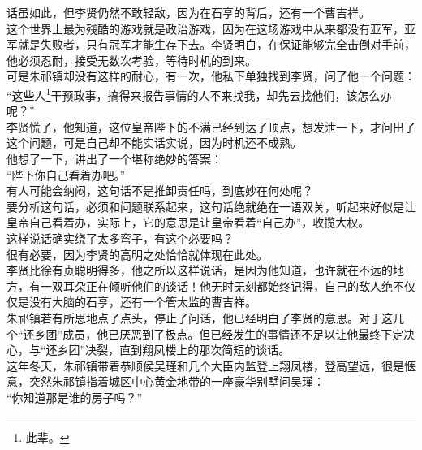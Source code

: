 \begin{multicols}{\theparacolNo}
话虽如此，但李贤仍然不敢轻敌，因为在石亨的背后，还有一个曹吉祥。\\

这个世界上最为残酷的游戏就是政治游戏，因为在这场游戏中从来都没有亚军，亚军就是失败者，只有冠军才能生存下去。李贤明白，在保证能够完全击倒对手前，他必须忍耐，接受无数次考验，等待时机的到来。\\

可是朱祁镇却没有这样的耐心，有一次，他私下单独找到李贤，问了他一个问题：\\

“这些人\footnote{此辈。}干预政事，搞得来报告事情的人不来找我，却先去找他们，该怎么办呢？”\\

李贤慌了，他知道，这位皇帝陛下的不满已经到达了顶点，想发泄一下，才问出了这个问题，可是自己却不能实话实说，因为时机还不成熟。\\

他想了一下，讲出了一个堪称绝妙的答案：\\

“陛下你自己看着办吧。”\\

有人可能会纳闷，这句话不是推卸责任吗，到底妙在何处呢？\\

要分析这句话，必须和问题联系起来，这句话绝就绝在一语双关，听起来好似是让皇帝自己看着办，实际上，它的意思是让皇帝看着“自己办”，收揽大权。\\

这样说话确实绕了太多弯子，有这个必要吗？\\

很有必要，因为李贤的高明之处恰恰就体现在此处。\\

李贤比徐有贞聪明得多，他之所以这样说话，是因为他知道，也许就在不远的地方，有一双耳朵正在倾听他们的谈话！他无时无刻都始终记得，自己的敌人绝不仅仅是没有大脑的石亨，还有一个管太监的曹吉祥。\\

朱祁镇若有所思地点了点头，停止了问话，他已经明白了李贤的意思。对于这几个“还乡团”成员，他已厌恶到了极点。但已经发生的事情还不足以让他最终下定决心，与“还乡团”决裂，直到翔凤楼上的那次简短的谈话。\\

这年冬天，朱祁镇带着恭顺侯吴瑾和几个大臣内监登上翔凤楼，登高望远，很是惬意，突然朱祁镇指着城区中心黄金地带的一座豪华别墅问吴瑾：\\

“你知道那是谁的房子吗？”\\


\end{multicols}
